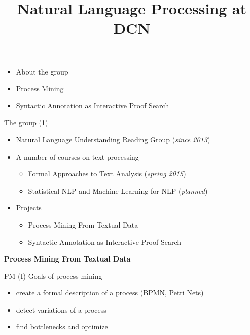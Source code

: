 \documentclass{beamer}
\begin{document}
\title{\Large{Natural Language Processing at DCN}}
\author{}
\institute{}
\date{} 

\begin{frame}
    \thispagestyle{empty}
    \titlepage
\end{frame}

\begin{frame}{}
    \setcounter{framenumber}{1}
    \begin{itemize}
        \item About the group
        \item Process Mining
        \item Syntactic Annotation as Interactive Proof Search
    \end{itemize}
\end{frame}

\begin{frame}{The group (1)}
\begin{itemize}
    \item Natural Language Understanding Reading Group (\textit{since 2013})
    \item A number of courses on text processing
        \begin{itemize}
            \item Formal Approaches to Text Analysis (\textit{spring 2015})
            \item Statistical NLP and Machine Learning for NLP (\textit{planned})
        \end{itemize}
    \item Projects
        \begin{itemize}
            \item Process Mining From Textual Data
            \item Syntactic Annotation as Interactive Proof Search
        \end{itemize}
\end{itemize}
\end{frame}

\begin{frame}{}
\begin{center}
	\textbf{Process Mining From Textual Data}
\end{center}
\end{frame}

\begin{frame}{PM (I)}
Goals of process mining\\
\bigskip
\begin{itemize}
    \item create a formal description of a process (BPMN, Petri Nets)
    \item detect variations of a process
    \item find bottlenecks and optimize
\end{itemize}
\end{frame}
\end{document}
